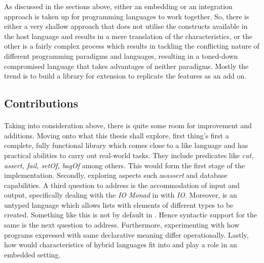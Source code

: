 \documentclass[proposal.tex]{subfiles}
\begin{document}
\par As discussed in the sections above, either an embedding or an integration approach is taken up for programming languages to work together. 
So, there is either a very shallow approach that does not utilise the constructs available in the host language and results in a mere translation of the 
characteristics, or the other is a fairly complex process which results in tackling the conflicting nature of different programming paradigms and 
languages, resulting in a toned-down  compromised language that takes advantages of neither paradigms. Mostly the trend is to build a library for 
extension to replicate the features as an add on.       

\subsection{Contributions}
\paragraph{}
Taking into consideration above, there is quite some room for improvement and additions. Moving onto what this thesis shall explore, first thing's first a 
complete, fully functional library which comes close to a  like language and has practical abilities to carry out real-world tasks. They 
include predicates like \textit{cut, assert, fail, setOf, bagOf} among others. This would form the first stage of the implementation. Secondly, exploring 
aspects such as\textit{assert} and database capabilities. A third question to address is the accommodation of input and output, specifically dealing with 
the \textit{IO Monad} in  with  \textit{IO}. Moreover,  is an untyped language which allows lists 
with elements of different types to be created. Something like this is not by default in . Hence syntactic support for the same is the next 
question to address. Furthermore, experimenting with how programs expressed with same declarative meaning differ operationally. Lastly, how would 
characteristics of hybrid languages fit into and play a role in an embedded setting.  
\end{document}
